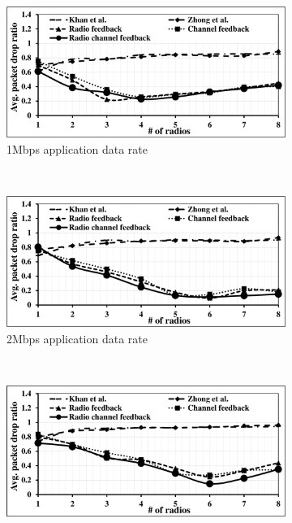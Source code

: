 \begin{landscape}
\begin{figure}[!htbp]
    \centering
    \begin{subfigure}[t]{0.625\textwidth}
        \includegraphics[width=\textwidth]{alltopology/16PacketDropRatio24d1}
        \caption{1Mbps application data rate}
    \end{subfigure}
    ~
    \begin{subfigure}[t]{0.625\textwidth}
        \includegraphics[width=\textwidth]{alltopology/12PacketDropRatio24d2}
        \caption{2Mbps application data rate}
    \end{subfigure}
    ~\\
    \begin{subfigure}[t]{0.625\textwidth}
        \includegraphics[width=\textwidth]{alltopology/12PacketDropRatio24d4}

\end{subfigure}
\end{figure}
\end{landscape}
